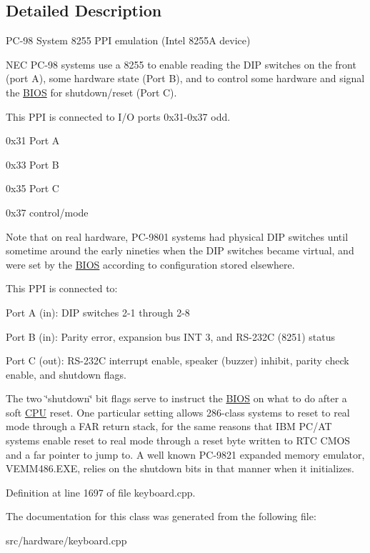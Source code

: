 \subsection{Detailed Description}
P\-C-\/98 System 8255 P\-P\-I emulation (Intel 8255\-A device) 

N\-E\-C P\-C-\/98 systems use a 8255 to enable reading the D\-I\-P switches on the front (port A), some hardware state (Port B), and to control some hardware and signal the \hyperlink{classBIOS}{B\-I\-O\-S} for shutdown/reset (Port C).

This P\-P\-I is connected to I/\-O ports 0x31-\/0x37 odd.
\begin{DoxyItemize}
\item 0x31 Port A
\item 0x33 Port B
\item 0x35 Port C
\item 0x37 control/mode
\end{DoxyItemize}

Note that on real hardware, P\-C-\/9801 systems had physical D\-I\-P switches until sometime around the early nineties when the D\-I\-P switches became virtual, and were set by the \hyperlink{classBIOS}{B\-I\-O\-S} according to configuration stored elsewhere.

This P\-P\-I is connected to\-:
\begin{DoxyItemize}
\item Port A (in)\-: D\-I\-P switches 2-\/1 through 2-\/8
\item Port B (in)\-: Parity error, expansion bus I\-N\-T 3, and R\-S-\/232\-C (8251) status
\item Port C (out)\-: R\-S-\/232\-C interrupt enable, speaker (buzzer) inhibit, parity check enable, and shutdown flags.
\end{DoxyItemize}

The two \char`\"{}shutdown\char`\"{} bit flags serve to instruct the \hyperlink{classBIOS}{B\-I\-O\-S} on what to do after a soft \hyperlink{classCPU}{C\-P\-U} reset. One particular setting allows 286-\/class systems to reset to real mode through a F\-A\-R return stack, for the same reasons that I\-B\-M P\-C/\-A\-T systems enable reset to real mode through a reset byte written to R\-T\-C C\-M\-O\-S and a far pointer to jump to. A well known P\-C-\/9821 expanded memory emulator, V\-E\-M\-M486.\-E\-X\-E, relies on the shutdown bits in that manner when it initializes. 

Definition at line 1697 of file keyboard.\-cpp.



The documentation for this class was generated from the following file\-:\begin{DoxyCompactItemize}
\item 
src/hardware/keyboard.\-cpp\end{DoxyCompactItemize}
